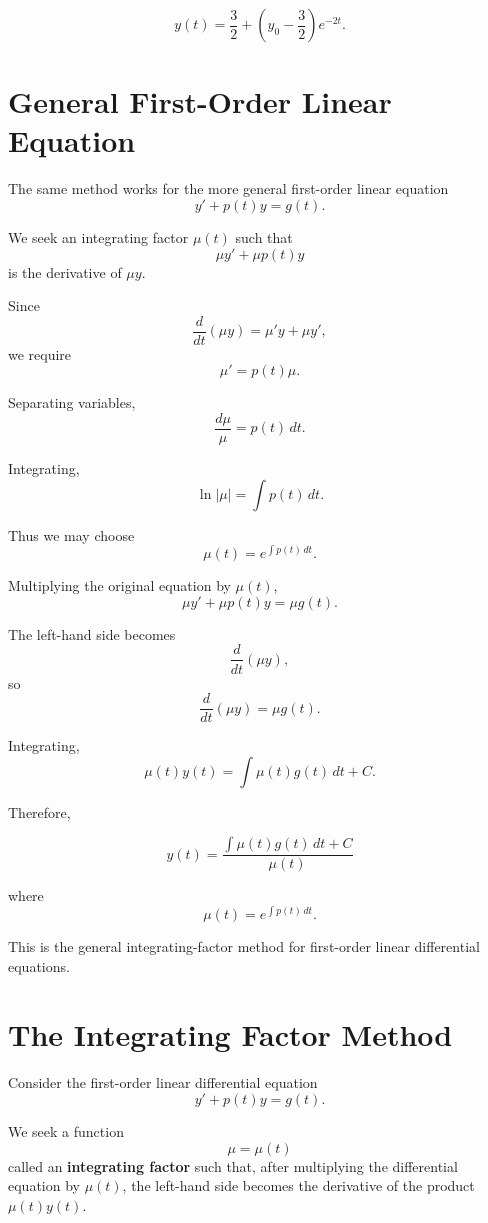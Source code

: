 \documentclass[11pt]{article}
\begin{document}
\[
\boxed{
y(t)
=
\frac{3}{2}
+
\left(
y_0-\frac{3}{2}
\right)e^{-2t}
}.
\]

\section{General First-Order Linear Equation}

The same method works for the more general first-order linear equation
\[
y'+p(t)y=g(t).
\]

We seek an integrating factor \(\mu(t)\) such that
\[
\mu y'+\mu p(t)y
\]
is the derivative of \(\mu y\).

Since
\[
\frac{d}{dt}(\mu y)
=
\mu'y+\mu y',
\]
we require
\[
\mu'=p(t)\mu.
\]

Separating variables,
\[
\frac{d\mu}{\mu}=p(t)\,dt.
\]

Integrating,
\[
\ln|\mu|
=
\int p(t)\,dt.
\]

Thus we may choose
\[
\boxed{
\mu(t)
=
e^{\int p(t)\,dt}
}.
\]

Multiplying the original equation by \(\mu(t)\),
\[
\mu y'+\mu p(t)y
=
\mu g(t).
\]

The left-hand side becomes
\[
\frac{d}{dt}\left(\mu y\right),
\]
so
\[
\frac{d}{dt}\left(\mu y\right)
=
\mu g(t).
\]

Integrating,
\[
\mu(t)y(t)
=
\int \mu(t)g(t)\,dt+C.
\]

Therefore,

\[
\boxed{
y(t)
=
\frac{
\displaystyle
\int \mu(t)g(t)\,dt+C
}{
\mu(t)
}
}
\]

where
\[
\boxed{
\mu(t)=e^{\int p(t)\,dt}
}.
\]

This is the general integrating-factor method for first-order linear differential equations.

\section{The Integrating Factor Method}

Consider the first-order linear differential equation
\[
y'+p(t)y=g(t).
\]

We seek a function
\[
\mu=\mu(t)
\]
called an \textbf{integrating factor} such that, after multiplying the
differential equation by \(\mu(t)\), the left-hand side becomes the
derivative of the product \(\mu(t)y(t)\).
\end{document}
